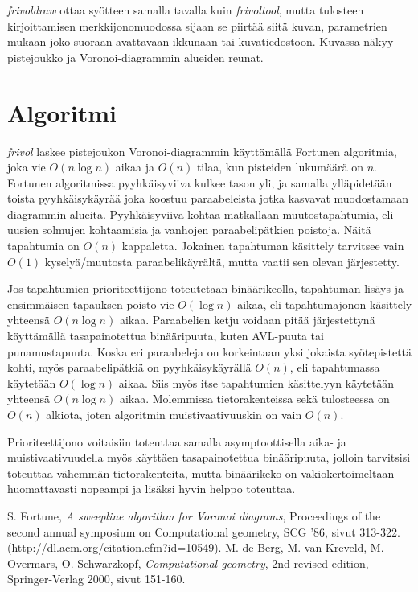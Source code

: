 \documentclass[a4paper, 11pt, finnish]{article}
\begin{document}
\emph{frivoldraw} ottaa syötteen samalla tavalla kuin \emph{frivoltool}, mutta tulosteen kirjoittamisen merkkijonomuodossa sijaan se piirtää siitä kuvan, parametrien mukaan joko suoraan avattavaan ikkunaan tai kuvatiedostoon. Kuvassa näkyy pistejoukko ja Voronoi-diagrammin alueiden reunat.

\section*{Algoritmi}
\emph{frivol} laskee pistejoukon Voronoi-diagrammin käyttämällä Fortunen algoritmia, joka vie $O(n \log n)$ aikaa ja $O(n)$ tilaa, kun pisteiden lukumäärä on $n$. Fortunen algoritmissa pyyhkäisyviiva kulkee tason yli, ja samalla ylläpidetään toista pyyhkäisykäyrää joka koostuu paraabeleista jotka kasvavat muodostamaan diagrammin alueita. Pyyhkäisyviiva kohtaa matkallaan muutostapahtumia, eli uusien solmujen kohtaamisia ja vanhojen paraabelipätkien poistoja. Näitä tapahtumia on $O(n)$ kappaletta. Jokainen tapahtuman käsittely tarvitsee vain $O(1)$ kyselyä/muutosta paraabelikäyrältä, mutta vaatii sen olevan järjestetty.\cite{fortunepaperi}\cite{compgeomkirja}

Jos tapahtumien prioriteettijono toteutetaan binäärikeolla, tapahtuman lisäys ja ensimmäisen tapauksen poisto vie $O(\log n)$ aikaa, eli tapahtumajonon käsittely yhteensä $O(n \log n)$ aikaa. Paraabelien ketju voidaan pitää järjestettynä käyttämällä tasapainotettua binääripuuta, kuten AVL-puuta tai punamustapuuta. Koska eri paraabeleja on korkeintaan yksi jokaista syötepistettä kohti, myös paraabelipätkiä on pyyhkäisykäyrällä $O(n)$, eli tapahtumassa käytetään $O(\log n)$ aikaa. Siis myös itse tapahtumien käsittelyyn käytetään yhteensä $O(n \log n)$ aikaa. Molemmissa tietorakenteissa sekä tulosteessa\cite{fortunepaperi} on $O(n)$ alkiota, joten algoritmin muistivaativuuskin on vain $O(n)$.

Prioriteettijono voitaisiin toteuttaa samalla asymptoottisella aika- ja muistivaativuudella myös käyttäen tasapainotettua binääripuuta, jolloin tarvitsisi toteuttaa vähemmän tietorakenteita, mutta binäärikeko on vakiokertoimeltaan huomattavasti nopeampi ja lisäksi hyvin helppo toteuttaa.

\begin{thebibliography}{9}
 S. Fortune, \emph{A sweepline algorithm for Voronoi diagrams}, Proceedings of the second annual symposium on Computational geometry, SCG '86, sivut 313-322. (\url{http://dl.acm.org/citation.cfm?id=10549}).
 M. de Berg, M. van Kreveld, M. Overmars, O. Schwarzkopf, \emph{Computational geometry}, 2nd revised edition, Springer-Verlag 2000, sivut 151-160.
\end{thebibliography}
\end{document}
